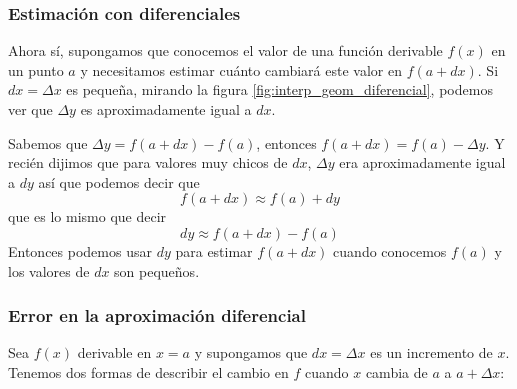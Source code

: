 \documentclass[12pt]{article}
\begin{document}
\subsubsection{Estimación con diferenciales}
\vspace{0.2cm}

Ahora sí, supongamos que conocemos el valor de una función derivable $ f(x) $ en un punto $ a $ y necesitamos estimar cuánto cambiará este valor en $ f(a + dx) $. Si $ dx = \Delta x $ es pequeña, mirando la figura \ref{fig:interp_geom_diferencial}, podemos ver que $ \Delta y $ es aproximadamente igual a $ dx $.

Sabemos que $ \Delta y = f(a + dx) - f(a) $, entonces $ f(a + dx) = f(a) - \Delta y $. Y recién dijimos que para valores muy chicos de $ dx $, $ \Delta y $ era aproximadamente igual a $ dy $ así que podemos decir que
\[
	f(a + dx) \approx f(a) + dy
\]
que es lo mismo que decir 
\[
dy \approx f(a + dx) - f(a)
\]
Entonces podemos usar $ dy $ para estimar $ f(a + dx) $ cuando conocemos $ f(a) $ y los valores de $ dx $ son pequeños.

\subsubsection{Error en la aproximación diferencial}
Sea $ f(x) $ derivable en $ x = a $ y supongamos que $ dx = \Delta x $ es un incremento de $ x $. Tenemos dos formas de describir el cambio en $ f $ cuando $ x $ cambia de $ a $ a $ a + \Delta x $:
\end{document}
